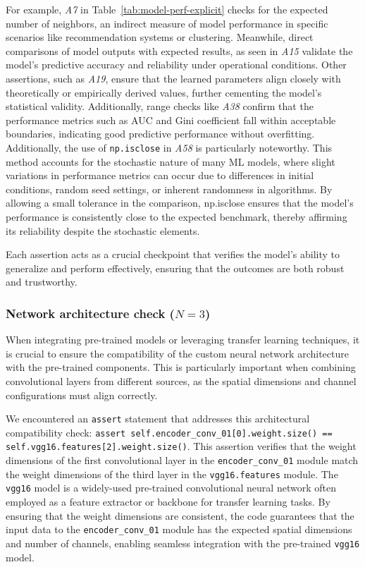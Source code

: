 For example, \emph{A7} in Table~\ref{tab:model-perf-explicit} checks for the expected number of neighbors, an indirect measure of model performance in specific scenarios like recommendation systems or clustering. Meanwhile, direct comparisons of model outputs with expected results, as seen in \emph{A15} validate the model's predictive accuracy and reliability under operational conditions. Other assertions, such as \emph{A19}, ensure that the learned parameters align closely with theoretically or empirically derived values, further cementing the model’s statistical validity. Additionally, range checks like \emph{A38} confirm that the performance metrics such as AUC and Gini coefficient fall within acceptable boundaries, indicating good predictive performance without overfitting. Additionally, the use of \texttt{np.isclose} in \emph{A58} is particularly noteworthy. This method accounts for the stochastic nature of many ML models, where slight variations in performance metrics can occur due to differences in initial conditions, random seed settings, or inherent randomness in algorithms. By allowing a small tolerance in the comparison, np.isclose ensures that the model's performance is consistently close to the expected benchmark, thereby affirming its reliability despite the stochastic elements.

Each assertion acts as a crucial checkpoint that verifies the model's ability to generalize and perform effectively, ensuring that the outcomes are both robust and trustworthy.

\subsubsection{Network architecture check ($N = 3$)}

When integrating pre-trained models or leveraging transfer learning techniques, it is crucial to ensure the compatibility of the custom neural network architecture with the pre-trained components. This is particularly important when combining convolutional layers from different sources, as the spatial dimensions and channel configurations must align correctly.

We encountered an \texttt{assert} statement that addresses this architectural compatibility check: \lstinline{assert self.encoder_conv_01[0].weight.size() == self.vgg16.features[2].weight.size()}. This assertion verifies that the weight dimensions of the first convolutional layer in the \lstinline{encoder_conv_01} module match the weight dimensions of the third layer in the \lstinline{vgg16.features} module. The \lstinline{vgg16} model is a widely-used pre-trained convolutional neural network often employed as a feature extractor or backbone for transfer learning tasks. By ensuring that the weight dimensions are consistent, the code guarantees that the input data to the \lstinline{encoder_conv_01} module has the expected spatial dimensions and number of channels, enabling seamless integration with the pre-trained \lstinline{vgg16} model.

